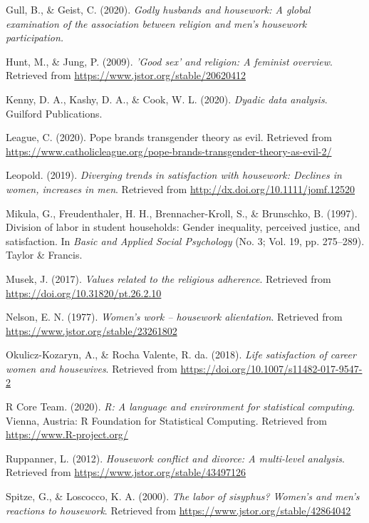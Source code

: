 \documentclass[
  man,floatsintext]{apa6}
\newlength{\cslhangindent}
\newlength{\cslentryspacingunit} %
\newenvironment{CSLReferences}[2] %
 {%
  \setlength{\parindent}{0pt}
  \ifodd #1
  \let\oldpar\par
  \def\par{\hangindent=\cslhangindent\oldpar}
  \fi
  \setlength{\parskip}{#2\cslentryspacingunit}
 }%
 {}
\begin{document}
\begin{CSLReferences}{1}{0}
\leavevmode{}%
Gull, B., \& Geist, C. (2020). \emph{Godly husbands and housework: A global examination of the association between religion and men's housework participation.}

\leavevmode{}%
Hunt, M., \& Jung, P. (2009). \emph{'Good sex' and religion: A feminist overview}. Retrieved from \url{https://www.jstor.org/stable/20620412}

\leavevmode{}%
Kenny, D. A., Kashy, D. A., \& Cook, W. L. (2020). \emph{Dyadic data analysis}. Guilford Publications.

\leavevmode{}%
League, C. (2020). Pope brands transgender theory as evil. Retrieved from \url{https://www.catholicleague.org/pope-brands-transgender-theory-as-evil-2/}

\leavevmode{}%
Leopold. (2019). \emph{Diverging trends in satisfaction with housework: Declines in women, increases in men}. Retrieved from \url{http://dx.doi.org/10.1111/jomf.12520}

\leavevmode{}%
Mikula, G., Freudenthaler, H. H., Brennacher-Kroll, S., \& Brunschko, B. (1997). Division of labor in student households: Gender inequality, perceived justice, and satisfaction. In \emph{Basic and Applied Social Psychology} (No. 3; Vol. 19, pp. 275--289). Taylor \& Francis.

\leavevmode{}%
Musek, J. (2017). \emph{Values related to the religious adherence}. Retrieved from \url{https://doi.org/10.31820/pt.26.2.10}

\leavevmode{}%
Nelson, E. N. (1977). \emph{Women's work -- housework alientation}. Retrieved from \url{https://www.jstor.org/stable/23261802}

\leavevmode{}%
Okulicz-Kozaryn, A., \& Rocha Valente, R. da. (2018). \emph{Life satisfaction of career women and housewives}. Retrieved from \url{https://doi.org/10.1007/s11482-017-9547-2}

\leavevmode{}%
R Core Team. (2020). \emph{R: A language and environment for statistical computing}. Vienna, Austria: R Foundation for Statistical Computing. Retrieved from \url{https://www.R-project.org/}

\leavevmode{}%
Ruppanner, L. (2012). \emph{Housework conflict and divorce: A multi-level analysis}. Retrieved from \url{https://www.jstor.org/stable/43497126}

\leavevmode{}%
Spitze, G., \& Loscocco, K. A. (2000). \emph{The labor of sisyphus? Women's and men's reactions to housework}. Retrieved from \url{https://www.jstor.org/stable/42864042}

\end{CSLReferences}


\clearpage
\renewcommand{\listfigurename}{Figure captions}

\clearpage
\renewcommand{\listtablename}{Table captions}
\end{document}
